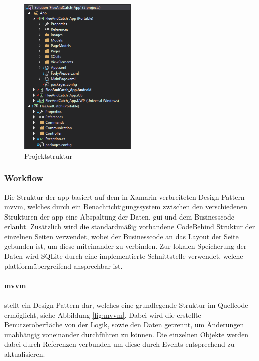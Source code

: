 \begin{figure}[h]
	\begin{center}
		\includegraphics[width=0.5\textwidth]{images/implementation/solution.png}
	\end{center}
	\caption{Projektstruktur}
	\label{fig:solution}
\end{figure}

\newpage
\subsubsection{Workflow} %

Die Struktur der \gls{app} basiert auf dem in Xamarin verbreiteten Design Pattern \acrlong{mvvm}, welches durch ein Benachrichtigungssystem zwischen den verschiedenen Strukturen der \gls{app} eine Abspaltung der Daten, \gls{gui} und dem Businesscode erlaubt. Zusätzlich wird die standardmäßig vorhandene CodeBehind Struktur der einzelnen Seiten verwendet, wobei der Businesscode an das Layout der Seite gebunden ist, um diese miteinander zu verbinden. Zur lokalen Speicherung der Daten wird SQLite durch eine implementierte Schnittstelle verwendet, welche plattformübergreifend ansprechbar ist.

\paragraph{\acrfull{mvvm}}

stellt ein Design Pattern dar, welches eine grundlegende Struktur im Quellcode ermöglicht, siehe Abbildung \ref{fig:mvvm}. Dabei wird die erstellte Benutzeroberfläche von der Logik, sowie den Daten getrennt, um Änderungen unabhängig voneinander durchführen zu können. Die einzelnen Objekte werden dabei durch Referenzen verbunden um diese durch Events entsprechend zu aktualisieren.\\

